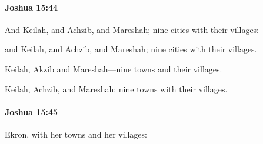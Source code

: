 		\paragraph{Joshua 15:44} %
			\label{JOSHUA-15-44}

			And Keilah, and Achzib, and Mareshah; nine cities with their villages:

			\begin{versebox}
					\item[BHS] 
					\item[ASV] and Keilah, and Achzib, and Mareshah; nine cities with their villages.
					\item[NIV] Keilah, Akzib and Mareshah—nine towns and their villages.
					\item[NRSV] Keilah, Achzib, and Mareshah: nine towns with their villages.
			\end{versebox}

		\paragraph{Joshua 15:45} %
			\label{JOSHUA-15-45}

			Ekron, with her towns and her villages:

